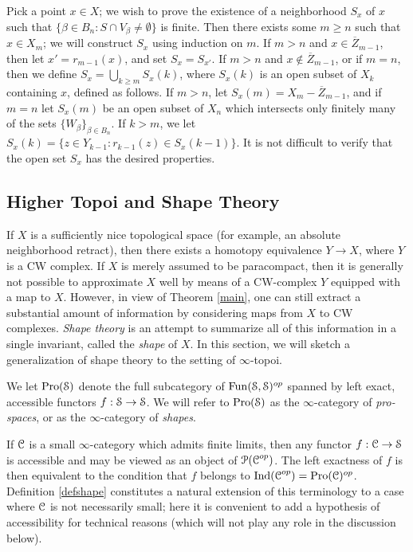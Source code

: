 \begin{remark}
Pick a point $x \in X$; we wish to prove the existence of a neighborhood $S_x$ of $x$ such that
$\{ \beta \in B_n: S \cap V_{\beta} \neq \emptyset \}$ is finite. Then there exists some
$m \geq n$ such that $x \in X_{m}$; we will construct $S_{x}$ using induction on $m$. 
If $m > n$ and $x \in \overline{Z}_{m-1}$, then let $x' = r_{m-1}(x)$, and set
$S_{x} = S_{x'}$. If $m > n$ and $x \notin \overline{Z}_{m-1}$, or if
$m=n$, then we define $S_{x} = \bigcup_{k \geq m} S_{x}(k)$, where
$S_x(k)$ is an open subset of $X_{k}$ containing $x$, defined as follows.
If $m > n$, let $S_x(m) = X_{m} - \overline{Z}_{m-1}$, and if
$m=n$ let $S_x(m)$ be an open subset of $X_n$ which intersects only finitely many of the sets
$\{ W_{\beta} \}_{ \beta \in B_n }$. If $k > m$, we let 
$S_{x}(k) =  \{ z \in Y_{k-1}: r_{k-1}(z) \in S_x(k-1) \}.$
It is not difficult to verify that the open set $S_x$ has the desired properties.
\end{remark}

\subsection{Higher Topoi and Shape Theory}\label{shapesec}

If $X$ is a sufficiently nice topological space (for example, an absolute neighborhood retract), then there exists a homotopy equivalence $Y \rightarrow X$, where $Y$ is a CW complex.
If $X$ is merely assumed to be paracompact, then it is generally not possible to approximate $X$ well by means of a CW-complex $Y$ equipped with a map to $X$. However, in view of Theorem \ref{main}, one can still extract a substantial amount of information by considering maps
from $X$ to CW complexes. {\it Shape theory} is an attempt to summarize all of this information in a single invariant, called the {\it shape} of $X$. In this section, we will sketch a generalization of shape theory to the setting of $\infty$-topoi.

\begin{definition}\label{defshape}
We let $\operatorname{Pro}(\operatorname{\mathcal{S}})$ denote the full subcategory of $\operatorname{Fun}(\operatorname{\mathcal{S}}, \operatorname{\mathcal{S}})^{op}$ spanned by
left exact, accessible functors $f: \operatorname{\mathcal{S}} \rightarrow \operatorname{\mathcal{S}}$. We will refer to $\operatorname{Pro}(\operatorname{\mathcal{S}})$
as the $\infty$-category of {\em pro-spaces}, or as the $\infty$-category of {\it shapes}.
\end{definition}

\begin{remark}
If $\operatorname{\mathcal{C}}$ is a small $\infty$-category which admits finite limits, then any functor
$f: \operatorname{\mathcal{C}} \rightarrow \operatorname{\mathcal{S}}$ is accessible and may be viewed as an object of $\operatorname{\mathcal{P}}(\operatorname{\mathcal{C}}^{op})$. 
The left exactness of $f$ is then equivalent to the condition that $f$ belongs to
$\operatorname{Ind}(\operatorname{\mathcal{C}}^{op}) = \operatorname{Pro}(\operatorname{\mathcal{C}})^{op}$. Definition \ref{defshape} constitutes a natural extension
of this terminology to a case where $\operatorname{\mathcal{C}}$ is not necessarily small; here it is convenient to add a hypothesis of accessibility for technical reasons (which will not play any role in the discussion below).
\end{remark}

